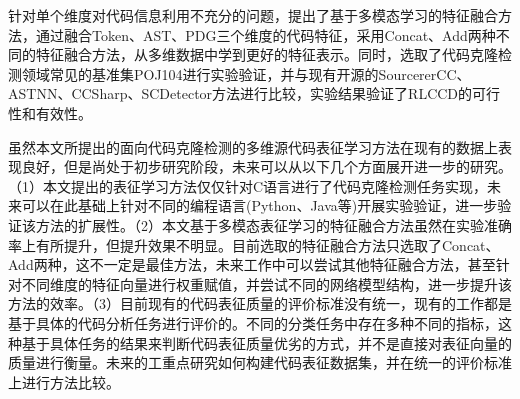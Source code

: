 \begin{conclusion}
针对单个维度对代码信息利用不充分的问题，提出了基于多模态学习的特征融合方法，通过融合Token、AST、PDG三个维度的代码特征，采用Concat、Add两种不同的特征融合方法，从多维数据中学到更好的特征表示。同时，选取了代码克隆检测领域常见的基准集POJ104进行实验验证，并与现有开源的SourcererCC\cite{7886988}、ASTNN\cite{8812062}、CCSharp\cite{9286111}、SCDetector\cite{10.1145/3324884.3416562}方法进行比较，实验结果验证了RLCCD的可行性和有效性。

虽然本文所提出的面向代码克隆检测的多维源代码表征学习方法在现有的数据上表现良好，但是尚处于初步研究阶段，未来可以从以下几个方面展开进一步的研究。（1）本文提出的表征学习方法仅仅针对C语言进行了代码克隆检测任务实现，未来可以在此基础上针对不同的编程语言(Python、Java等)开展实验验证，进一步验证该方法的扩展性。（2）本文基于多模态表征学习的特征融合方法虽然在实验准确率上有所提升，但提升效果不明显。目前选取的特征融合方法只选取了Concat、Add两种，这不一定是最佳方法，未来工作中可以尝试其他特征融合方法，甚至针对不同维度的特征向量进行权重赋值，并尝试不同的网络模型结构，进一步提升该方法的效率。（3）目前现有的代码表征质量的评价标准没有统一，现有的工作都是基于具体的代码分析任务进行评价的\cite{张祥平_2011}。不同的分类任务中存在多种不同的指标，这种基于具体任务的结果来判断代码表征质量优劣的方式，并不是直接对表征向量的质量进行衡量。未来的工重点研究如何构建代码表征数据集，并在统一的评价标准上进行方法比较。

\end{conclusion}
